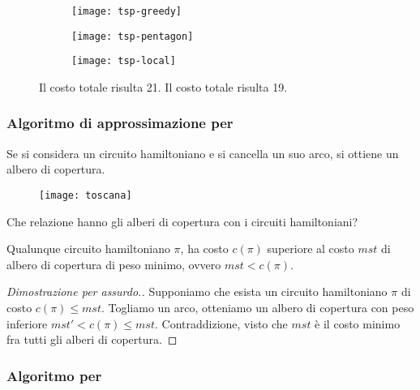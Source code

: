 \begin{figure}[H]\centering
	\hfill
	\begin{subfigure}[c]{.22\linewidth}\centering
		\texttt{[image: tsp-greedy]}
	\end{subfigure}%
	\hfill
	\begin{subfigure}[c]{.22\linewidth}\centering
		\texttt{[image: tsp-pentagon]}
	\end{subfigure}%
	\hfill
	\begin{subfigure}[c]{.22\linewidth}\centering
		\texttt{[image: tsp-local]}
	\end{subfigure}%
	\hfill\null
	\caption{Il costo totale risulta 21. Il costo totale risulta 19.}
\end{figure}

\subsubsection{Algoritmo di approssimazione per {\deltaTsp}}

Se si considera un circuito hamiltoniano e si cancella un suo arco, si ottiene un albero di copertura.

\begin{figure}[H]\centering
	\texttt{[image: toscana]}
\end{figure}

Che relazione hanno gli alberi di copertura con i circuiti hamiltoniani?

\begin{theorem}
Qualunque circuito hamiltoniano \(\pi\), ha costo \(c(\pi)\) superiore al costo \(\mathit{mst}\) di albero di copertura di peso minimo, ovvero \(\mathit{mst} < c(\pi)\).
\end{theorem}

\begin{proof}[Dimostrazione per assurdo.]
Supponiamo che esista un circuito hamiltoniano \(\pi\) di costo \(c(\pi) \leqslant \mathit{mst}\).
Togliamo un arco, otteniamo un albero di copertura con peso inferiore \(\mathit{mst}' < c(\pi) \leqslant \mathit{mst}\).
Contraddizione, visto che \(\mathit{mst}\) è il costo minimo fra tutti gli alberi di copertura.
\end{proof}

\subsubsection{Algoritmo per {\deltaTsp}}

